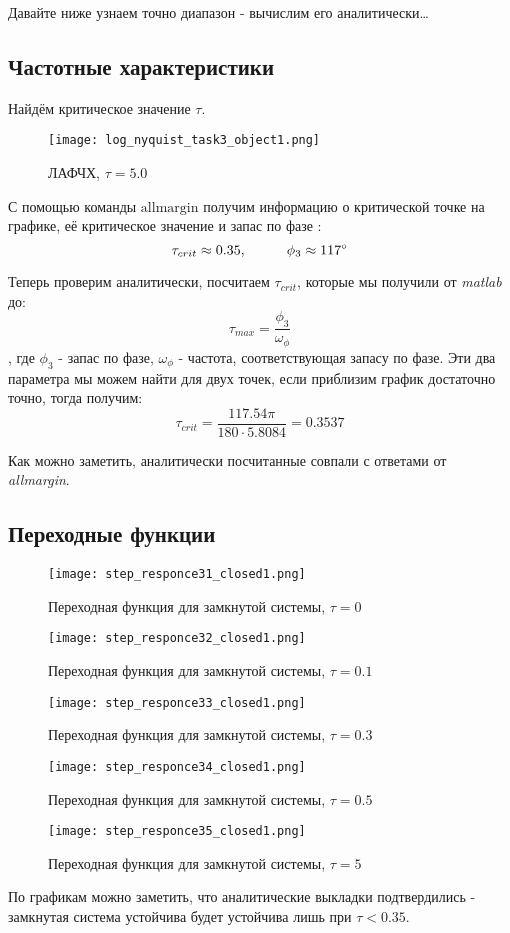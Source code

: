 Давайте ниже узнаем точно диапазон - вычислим его аналитически\dots

\newpage
\subsection{Частотные характеристики}
Найдём критическое значение $\tau$. 

\begin{figure}[ht]
    \centering
    \texttt{[image: log\_nyquist\_task3\_object1.png]}
    \caption{ЛАФЧХ, $\tau=5.0$}
\end{figure}
С помощью команды $\textrm{allmargin}$ получим информацию о критической точке на графике, её критическое значение и запас по фазе :
$$
 \tau_{crit} \approx 0.35, \hspace*{1cm} \phi_3 \approx 117^\circ
$$

Теперь проверим аналитически, посчитаем $\tau_{crit}$, которые мы получили от \textit{matlab} до:
$$
\tau_{max} = \frac{\phi_3}{\omega_\phi}
$$, где $\phi_3$ - запас по фазе, $\omega_\phi$ - частота, соответствующая запасу по фазе. Эти два параметра мы можем найти для двух точек, если приблизим график достаточно точно, тогда получим:
$$
\tau_{crit} = \frac{117.54\pi}{180\cdot 5.8084} = 0.3537
$$

Как можно заметить, аналитически посчитанные совпали с ответами от \textit{allmargin}.


\newpage
\subsection{Переходные функции}
\begin{figure}[ht]
    \centering
    \texttt{[image: step\_responce31\_closed1.png]}
    \caption{Переходная функция для замкнутой системы, $\tau=0$}
\end{figure}
\begin{figure}[ht]
    \centering
    \texttt{[image: step\_responce32\_closed1.png]}
    \caption{Переходная функция для замкнутой системы, $\tau=0.1$}
\end{figure}

\newpage
\begin{figure}[ht]
    \centering
    \texttt{[image: step\_responce33\_closed1.png]}
    \caption{Переходная функция для замкнутой системы, $\tau=0.3$}
\end{figure}
\begin{figure}[ht]
    \centering
    \texttt{[image: step\_responce34\_closed1.png]}
    \caption{Переходная функция для замкнутой системы, $\tau=0.5$}
\end{figure}
\newpage
\begin{figure}[ht]
    \centering
    \texttt{[image: step\_responce35\_closed1.png]}
    \caption{Переходная функция для замкнутой системы, $\tau=5$}
\end{figure}
По графикам можно заметить, что аналитические выкладки подтвердились - замкнутая система устойчива будет устойчива лишь при $\tau < 0.35 $.


